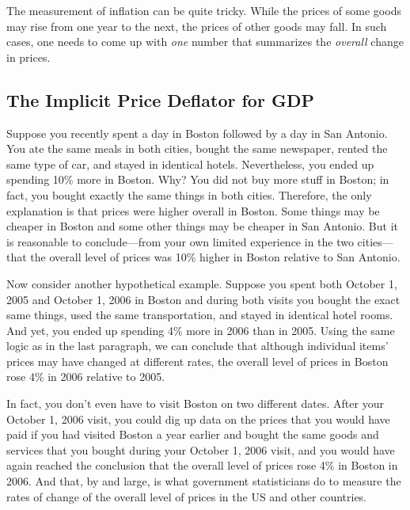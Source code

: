 \documentclass[
  letterpaper,
]{book}
\begin{document}
The measurement of inflation can be quite tricky. While the prices of
some goods may rise from one year to the next, the prices of other goods
may fall. In such cases, one needs to come up with \emph{one} number
that summarizes the \emph{overall} change in prices.

\subsection{The Implicit Price Deflator for GDP}\label{sec-IPDGDP}


Suppose you recently spent a day in Boston followed by a day in San
Antonio. You ate the same meals in both cities, bought the same
newspaper, rented the same type of car, and stayed in identical hotels.
Nevertheless, you ended up spending 10\% more in Boston. Why? You did
not buy more stuff in Boston; in fact, you bought exactly the same
things in both cities. Therefore, the only explanation is that prices
were higher overall in Boston. Some things may be cheaper in Boston and
some other things may be cheaper in San Antonio. But it is reasonable to
conclude---from your own limited experience in the two cities---that the
overall level of prices was 10\% higher in Boston relative to San
Antonio.

Now consider another hypothetical example. Suppose you spent both
October 1, 2005 and October 1, 2006 in Boston and during both visits you
bought the exact same things, used the same transportation, and stayed
in identical hotel rooms. And yet, you ended up spending 4\% more in
2006 than in 2005. Using the same logic as in the last paragraph, we can
conclude that although individual items' prices may have changed at
different rates, the overall level of prices in Boston rose 4\% in 2006
relative to 2005.

In fact, you don't even have to visit Boston on two different dates.
After your October 1, 2006 visit, you could dig up data on the prices
that you would have paid if you had visited Boston a year earlier and
bought the same goods and services that you bought during your October
1, 2006 visit, and you would have again reached the conclusion that the
overall level of prices rose 4\% in Boston in 2006. And that, by and
large, is what government statisticians do to measure the rates of
change of the overall level of prices in the US and other countries.
\end{document}
